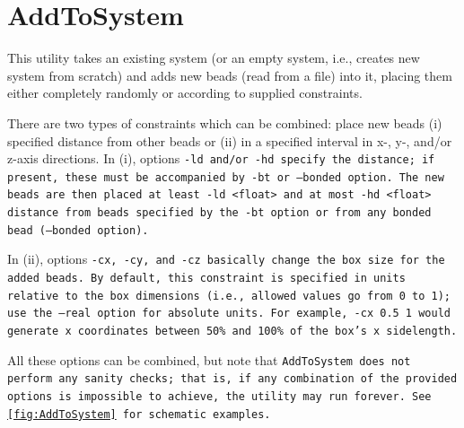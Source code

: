 \section{AddToSystem} \label{sec:AddToSystem}

This utility takes an existing system (or an empty system, i.e., creates new
system from scratch) and adds new beads (read from a \field file) into it,
placing them either completely randomly or according to supplied constraints.

There are two types of constraints which can be combined: place new beads (i)
specified distance from other beads or (ii) in a specified interval in x-, y-,
and/or z-axis directions. In (i), options \tt{-ld} and/or \tt{-hd} specify the
distance; if present, these must be accompanied by \tt{-bt} or \tt{--bonded}
option. The new beads are then placed at least \tt{-ld <float>} and at most
\tt{-hd <float>} distance from beads specified by the \tt{-bt} option or from
any bonded bead (\tt{--bonded} option).

In (ii), options \tt{-cx}, \tt{-cy}, and \tt{-cz} basically change the box size
for the added beads. By default, this constraint is specified in units relative
to the box dimensions (i.e., allowed values go from 0 to 1); use the \tt{--real}
option for absolute units. For example, \tt{-cx 0.5 1} would generate x
coordinates between 50\% and 100\% of the box's x sidelength.

All these options can be combined, but note that \tt{AddToSystem} does not
perform any sanity checks; that is, if any combination of the provided options
is impossible to achieve, the utility may run forever. See
\cref{fig:AddToSystem} for schematic examples.

